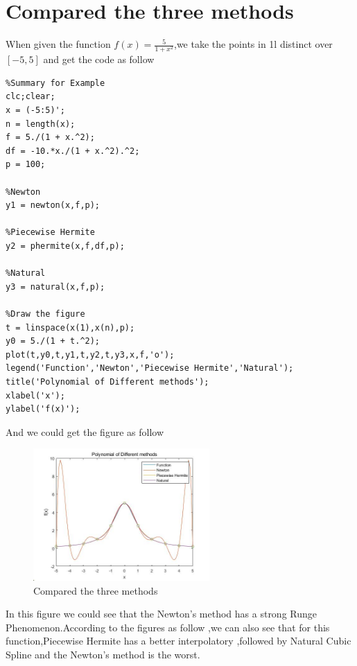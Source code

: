 \documentclass{article}
\begin{document}
\newpage
\section{Compared the three methods}
When given the function $f(x)=\frac{5}{1+x^2}$,we take the points in 1l distinct over $[-5,5]$ and get the code as follow
\begin{lstlisting}
%Summary for Example
clc;clear;
x = (-5:5)';
n = length(x);
f = 5./(1 + x.^2);
df = -10.*x./(1 + x.^2).^2;
p = 100;

%Newton
y1 = newton(x,f,p);

%Piecewise Hermite
y2 = phermite(x,f,df,p);

%Natural
y3 = natural(x,f,p);

%Draw the figure
t = linspace(x(1),x(n),p);
y0 = 5./(1 + t.^2);
plot(t,y0,t,y1,t,y2,t,y3,x,f,'o');
legend('Function','Newton','Piecewise Hermite','Natural');
title('Polynomial of Different methods');
xlabel('x');
ylabel('f(x)');
\end{lstlisting}

And we could get the figure as follow

\begin{figure}[h!]
\centering
\includegraphics[width=0.6\textwidth]{summary.jpg}
\caption{Compared the three methods}
\label{summary}
\end{figure}
 
 In this figure we could see that the Newton's method has a strong Runge Phenomenon.According to the figures as follow ,we can also see that for this function,Piecewise Hermite has a better interpolatory ,followed by Natural Cubic Spline and the Newton's method is the worst.
\end{document}
